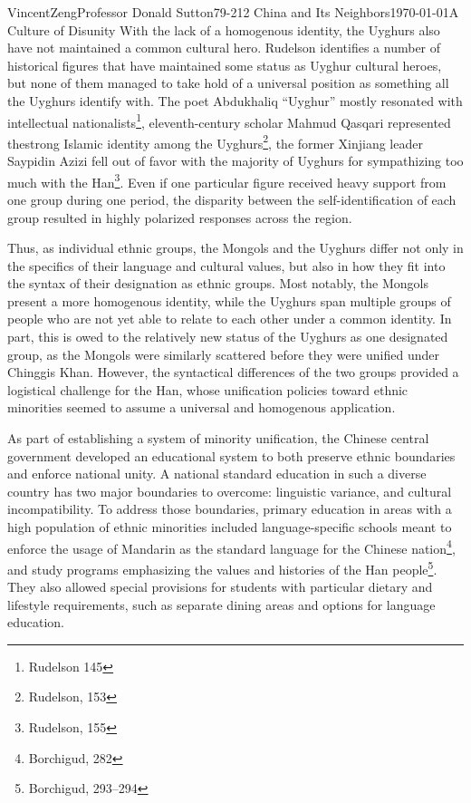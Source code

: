 \documentclass{article}[12pt]
\begin{document}
\begin{mla}{Vincent}{Zeng}{Professor Donald Sutton}{79-212 China and Its Neighbors}{\today}{A Culture of Disunity}
With the lack of a homogenous identity, the Uyghurs also have not maintained a
common cultural hero. Rudelson identifies a number of historical figures that
have maintained some status as Uyghur cultural heroes, but none of them managed
to take hold of a universal position as something all the Uyghurs identify
with. The poet Abdukhaliq ``Uyghur'' mostly resonated with intellectual
nationalists\footnote{Rudelson 145}, eleventh-century scholar Mahmud Qasqari
represented thestrong Islamic identity among the Uyghurs\footnote{Rudelson,
153}, the former Xinjiang leader Saypidin Azizi fell out of favor with the
majority of Uyghurs for sympathizing too much with the Han\footnote{Rudelson, 155}. Even if
one particular figure received heavy support from one group during one period,
the disparity between the self-identification of each group resulted in highly
polarized responses across the region.

Thus, as individual ethnic groups, the Mongols and the Uyghurs differ not only
in the specifics of their language and cultural values, but also in how they
fit into the syntax of their designation as ethnic groups. Most notably, the
Mongols present a more homogenous identity, while the Uyghurs span multiple
groups of people who are not yet able to relate to each other under a common
identity. In part, this is owed to the relatively new status of the Uyghurs as
one designated group, as the Mongols were similarly scattered before they were
unified under Chinggis Khan. However, the syntactical differences of the two
groups provided a logistical challenge for the Han, whose unification policies
toward ethnic minorities seemed to assume a universal and homogenous
application.
 
\hrulefill

As part of establishing a system of minority unification, the Chinese
central government developed an educational system to both preserve ethnic
boundaries and enforce national unity. A national standard education in such a
diverse country has two major boundaries to overcome: linguistic variance, and
cultural incompatibility. To address those boundaries, primary education in
areas with a high population of ethnic minorities included language-specific
schools meant to enforce the usage of Mandarin as the standard language for
the Chinese nation\footnote{Borchigud, 282}, and study programs emphasizing the
values and histories of the Han people\footnote{Borchigud, 293--294}. They also allowed special provisions for students with particular dietary and lifestyle requirements, such as separate dining areas and options for language education.


\end{mla}
\end{document}
